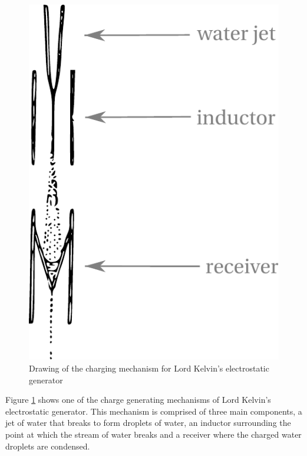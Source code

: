 \begin{figure}
    \centering
    \includegraphics[height=0.25\textheight]{content/appendices/chargedWaterDrops/graphics/Figure_Drawing_KelvinWaterDripper_ChargingMechanism}
    \caption{Drawing of the charging mechanism for Lord Kelvin's electrostatic
generator}
    \label{Figure_Drawing_KelvinWaterDripper_ChargingMechanism}
\end{figure}
Figure \ref{Figure_Drawing_KelvinWaterDripper_ChargingMechanism}
shows one of the charge generating mechanisms of Lord Kelvin's electrostatic
generator. This mechanism is comprised of three main components, a
jet of water that breaks to form droplets of water, an inductor surrounding
the point at which the stream of water breaks and a receiver where
the charged water droplets are condensed.

